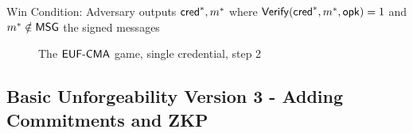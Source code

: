 Win Condition: Adversary outputs $\mathsf{cred}^*, m^*$ where $\mathsf{Verify}(\mathsf{cred}^*, m^*, \mathsf{opk}) = 1$ and $m^* \notin \mathsf{MSG}$ the signed messages
\begin{figure}
\begin{pchstack}[boxed, center, space=1em]
    \begin{pcvstack}
    \end{pcvstack}
\end{pchstack}
  \caption{The $\mathsf{EUF\text{-}CMA}$ game, single credential, step 2}
  \label{fig:prf}
\end{figure}






\subsection{Basic Unforgeability Version 3 - Adding Commitments and ZKP}



